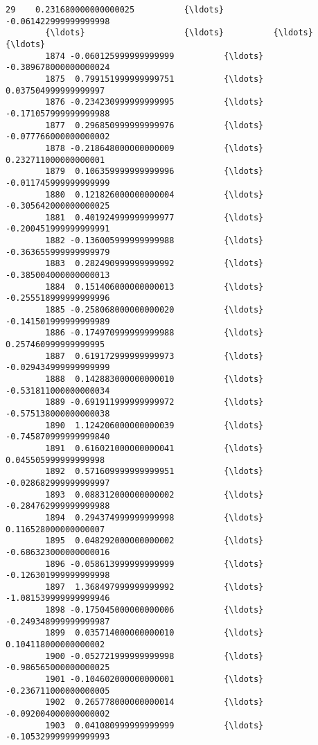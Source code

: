 \documentclass[11pt]{article}
\begin{document}
\begin{Verbatim}[commandchars=\\\{\}]
        29    0.231680000000000025          {\ldots}          -0.061422999999999998   
        {\ldots}                    {\ldots}          {\ldots}                            {\ldots}   
        1874 -0.060125999999999999          {\ldots}          -0.389678000000000024   
        1875  0.799151999999999751          {\ldots}           0.037504999999999997   
        1876 -0.234230999999999995          {\ldots}          -0.171057999999999988   
        1877  0.296850999999999976          {\ldots}          -0.077766000000000002   
        1878 -0.218648000000000009          {\ldots}           0.232711000000000001   
        1879  0.106359999999999996          {\ldots}          -0.011745999999999999   
        1880  0.121826000000000004          {\ldots}          -0.305642000000000025   
        1881  0.401924999999999977          {\ldots}          -0.200451999999999991   
        1882 -0.136005999999999988          {\ldots}          -0.363655999999999979   
        1883  0.282490999999999992          {\ldots}          -0.385004000000000013   
        1884  0.151406000000000013          {\ldots}          -0.255518999999999996   
        1885 -0.258068000000000020          {\ldots}          -0.141501999999999989   
        1886 -0.174970999999999988          {\ldots}           0.257460999999999995   
        1887  0.619172999999999973          {\ldots}          -0.029434999999999999   
        1888  0.142883000000000010          {\ldots}          -0.531811000000000034   
        1889 -0.691911999999999972          {\ldots}          -0.575138000000000038   
        1890  1.124206000000000039          {\ldots}          -0.745870999999999840   
        1891  0.616021000000000041          {\ldots}           0.045505999999999998   
        1892  0.571609999999999951          {\ldots}          -0.028682999999999997   
        1893  0.088312000000000002          {\ldots}          -0.284762999999999988   
        1894  0.294374999999999998          {\ldots}           0.116528000000000007   
        1895  0.048292000000000002          {\ldots}          -0.686323000000000016   
        1896 -0.058613999999999999          {\ldots}          -0.126301999999999998   
        1897  1.368497999999999992          {\ldots}          -1.081539999999999946   
        1898 -0.175045000000000006          {\ldots}          -0.249348999999999987   
        1899  0.035714000000000010          {\ldots}           0.104118000000000002   
        1900 -0.052721999999999998          {\ldots}          -0.986565000000000025   
        1901 -0.104602000000000001          {\ldots}          -0.236711000000000005   
        1902  0.265778000000000014          {\ldots}          -0.092004000000000002   
        1903  0.041080999999999999          {\ldots}          -0.105329999999999993   
        

\end{Verbatim}
\end{document}
